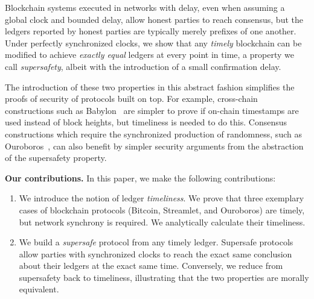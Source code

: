 Blockchain systems executed in networks with delay, even when assuming a global clock and
bounded delay, allow honest parties to reach consensus, but the ledgers reported by
honest parties are typically merely prefixes of one another.
Under perfectly synchronized clocks, we show that any \emph{timely} blockchain can be modified to achieve
\emph{exactly equal} ledgers at every point in time, a property we call \emph{supersafety},
albeit with the introduction of a small confirmation delay.

The introduction of these two
properties in this abstract fashion simplifies the proofs of security of protocols built on
top. For example, cross-chain constructions such as Babylon~\cite{babylon} are simpler
to prove if on-chain timestamps are used instead of block heights,
but timeliness is needed to do this.
Consensus constructions which require the synchronized production of randomness,
such as Ouroboros~\cite{ouroboros,praos}, can also benefit by simpler security
arguments from the abstraction of the supersafety property.

\noindent
\textbf{Our contributions.} In this paper, we make the following contributions:

\begin{enumerate}
  \item We introduce the notion of ledger \emph{timeliness}.
        We prove that three exemplary cases of blockchain protocols (Bitcoin, Streamlet, and Ouroboros)
        are timely, but network synchrony is required. We analytically calculate their timeliness.
  \item We build a \emph{supersafe} protocol from any timely ledger.
        Supersafe protocols allow parties with synchronized clocks to
        reach the exact same conclusion about their ledgers at the exact same time.
        Conversely, we reduce from supersafety back to timeliness, illustrating that
        the two properties are morally equivalent.
\end{enumerate}

